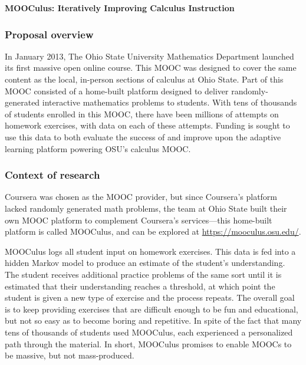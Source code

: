 \documentclass[12pt]{article}
\begin{document}
\begin{center}
  \textbf{MOOCulus: Iteratively Improving Calculus Instruction}
\end{center}

\subsubsection*{Proposal overview}

In January 2013, The Ohio State University Mathematics Department
launched its first massive open online course. This MOOC was designed
to cover the same content as the local, in-person sections of calculus
at Ohio State. Part of this MOOC consisted of a home-built platform
designed to deliver randomly-generated interactive mathematics
problems to students. With tens of thousands of students enrolled in
this MOOC, there have been millions of attempts on homework exercises,
with data on each of these attempts.  Funding is sought to use this
data to both evaluate the success of and improve upon the adaptive
learning platform powering OSU's calculus MOOC.


\subsubsection*{Context of research}

Coursera was chosen as the MOOC provider, but since Coursera's
platform lacked randomly generated math problems, the team at Ohio
State built their own MOOC platform to complement Coursera's
services---this home-built platform is called MOOCulus, and can be
explored at \url{https://mooculus.osu.edu/}.

MOOCulus logs all student input on homework exercises. This data is
fed into a hidden Markov model to produce an estimate of the student's
understanding. The student receives additional practice problems of
the same sort until it is estimated that their understanding reaches a
threshold, at which point the student is given a new type of exercise
and the process repeats.  The overall goal is to keep providing
exercises that are difficult enough to be fun and educational, but not
so easy as to become boring and repetitive.  In spite of the fact that
many tens of thousands of students used MOOCulus, each experienced a
personalized path through the material.  In short, MOOCulus promises
to enable MOOCs to be massive, but not mass-produced.
\end{document}

